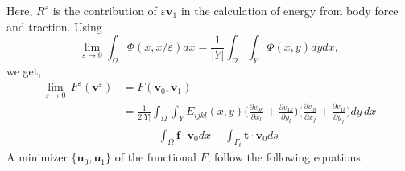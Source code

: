 \documentclass[10pt]{article}
\begin{document}
Here, $R^\varepsilon$ is the contribution of $\varepsilon\textbf{v}_1$ in the calculation of energy from body force and traction.
Using 
\begin{equation}
\lim_{\varepsilon\rightarrow 0}\int_\Omega \Phi(x, x/\varepsilon)dx = \frac{1}{|Y|}\int_\Omega\int_Y \Phi(x,y)dydx,
\end{equation}
we get,
\begin{equation}
\begin{split}
\lim_{\varepsilon\rightarrow 0}\,F^\varepsilon(\textbf{v}^\varepsilon)&=F(\textbf{v}_0,\textbf{v}_1)\\
&=\frac{1}{2|Y|}\int_\Omega\int_Y E_{ijkl}(x,y) \bigg (\frac{\partial v_{0k}}{\partial x_l}+\frac{\partial v_{1k}}{\partial y_l}\bigg )\bigg (\frac{\partial v_{0i}}{\partial x_j}+\frac{\partial v_{1i}}{\partial y_j}\bigg )dy\,dx\\
&\qquad-\int_\Omega\textbf{f}\cdot\textbf{v}_0 dx - \int_{\Gamma_t}\textbf{t}\cdot\textbf{v}_0 ds 
\end{split}
\end{equation}
A minimizer $\{\textbf{u}_0, \textbf{u}_1\}$ of the functional $F$, follow the following equations:
\end{document}
